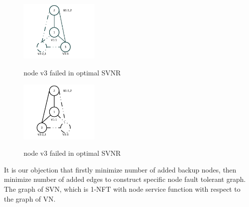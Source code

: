 \begin{figure}
\centering
\includegraphics[width=1.5in]{Fig/SVNR_opt_n2}\\
\caption{node v3 failed in optimal SVNR}\label{fig:optgraph_n2_fail}
\end{figure}

\begin{figure}
\centering
\includegraphics[width=1.5in]{Fig/SVNR_opt_n3}\\
\caption{node v3 failed in optimal SVNR}\label{fig:optgraph_n3_fail}
\end{figure}



It is our objection that firstly minimize number of added backup nodes, then minimize number of added edges to construct specific node fault tolerant graph. The graph of SVN, which is 1-NFT with node service function with respect to the graph of VN.



